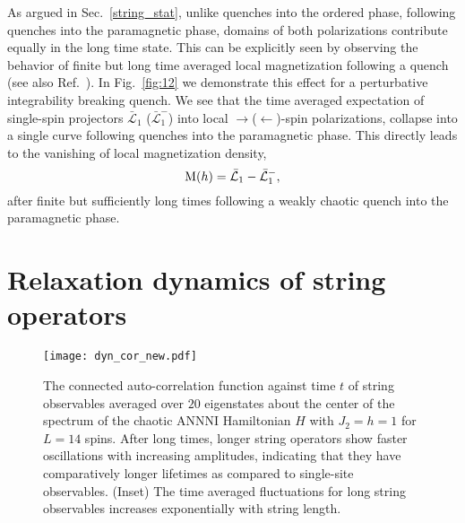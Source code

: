 \documentclass[aps,prx,twocolumn]{revtex4-2}
\begin{document}
{{As argued in Sec.~\ref{string_stat}, unlike quenches into the ordered phase, following quenches into the paramagnetic phase, domains of both polarizations contribute equally in the long time state. This can be explicitly seen by observing the behavior of finite but long time averaged local magnetization following a quench (see also Ref.~\cite{ettore20,halimeh21}). In Fig.~\ref{fig:12} we demonstrate this effect for a perturbative integrability breaking quench. We see that the time averaged expectation of single-spin projectors $\bar{\mathcal{L}}_1$ ($\bar{\mathcal{L}}^-_1$) into local $\rightarrow$($\leftarrow$)-spin polarizations, collapse into a single curve following quenches into the paramagnetic phase. This directly leads to the vanishing of local magnetization density,
\begin{equation}
	{\rm M}(h)=\bar{\mathcal{L}}_1-\bar{\mathcal{L}}_1^-,
\end{equation}
after finite but sufficiently long times following a weakly chaotic quench into the paramagnetic phase.


\section{Relaxation dynamics of string operators}
\label{Sec:Appendix_matele}

\begin{figure}[ht]
	\centering
	\texttt{[image: dyn\_cor\_new.pdf]}
	
	\caption{The connected auto-correlation function against time $t$ of string observables averaged over $20$ eigenstates about the center of the spectrum of the chaotic ANNNI Hamiltonian $H$ with $J_2=h=1$ for $L=14$ spins. After long times, longer string operators show faster oscillations with increasing amplitudes, indicating that they have comparatively longer lifetimes as compared to single-site observables. (Inset) The time averaged fluctuations for long string observables increases exponentially with string length.}
	\label{dyn_cor} 
\end{figure}


}}
\end{document}
